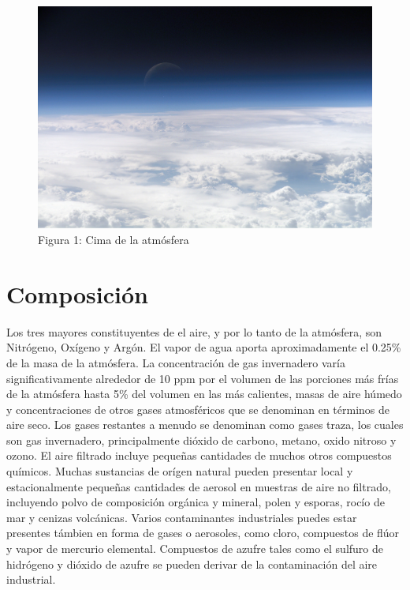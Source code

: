 \documentclass[12pt]{article}
\begin{document}
\begin{figure}
  \begin{centering}
  \includegraphics[scale = 0.09]{Top_of_Atmosphere.jpg}
  \caption{Figura 1: Cima de la atmósfera}
  \end{centering}
\end{figure}

\section{Composición}

Los tres mayores constituyentes de el aire, y por lo tanto de la atmósfera, son Nitrógeno, Oxígeno y Argón. El vapor de agua aporta aproximadamente el 0.25\% de la masa de la atmósfera. La concentración de gas invernadero varía significativamente alrededor de 10 ppm por el volumen de las porciones más frías de la atmósfera hasta 5\% del volumen en las más calientes, masas de aire húmedo y concentraciones de otros gases atmosféricos que se denominan en términos de aire seco. Los gases restantes a menudo se denominan como gases traza, los cuales son gas invernadero, principalmente dióxido de carbono, metano, oxido nitroso y ozono. El aire filtrado incluye pequeñas cantidades de muchos otros compuestos químicos. Muchas sustancias de orígen natural pueden presentar local y estacionalmente pequeñas cantidades de aerosol en muestras de aire no filtrado, incluyendo polvo de composición orgánica y mineral, polen y esporas, rocío de mar y cenizas volcánicas. Varios contaminantes industriales puedes estar presentes támbien en forma de gases o aerosoles, como cloro, compuestos de flúor y vapor de mercurio elemental. Compuestos de azufre tales como el sulfuro de hidrógeno y dióxido de azufre se pueden derivar de la contaminación del aire industrial.
\end{document}

